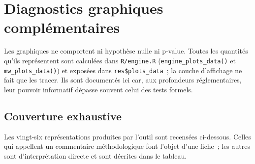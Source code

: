\documentclass[a4paper,11pt]{article}
\newcommand{\code}[1]{\texttt{\small #1}}
\begin{document}
\newpage
\clearpage
\section{Diagnostics graphiques complémentaires}

Les graphiques ne comportent ni hypothèse nulle ni p-value. Toutes les quantités
qu'ils représentent sont calculées dans \code{R/engine.R}
(\code{engine\_plots\_data()} et \code{mw\_plots\_data()}) et exposées dans
\code{res\$plots\_data}~; la couche d'affichage ne fait que les tracer. Ils sont
documentés ici car, aux profondeurs réglementaires, leur pouvoir informatif
dépasse souvent celui des tests formels.

\subsection{Couverture exhaustive}

Les vingt-six représentations produites par l'outil sont recensées ci-dessous.
Celles qui appellent un commentaire méthodologique font l'objet d'une fiche~; les
autres sont d'interprétation directe et sont décrites dans le tableau.
\end{document}
